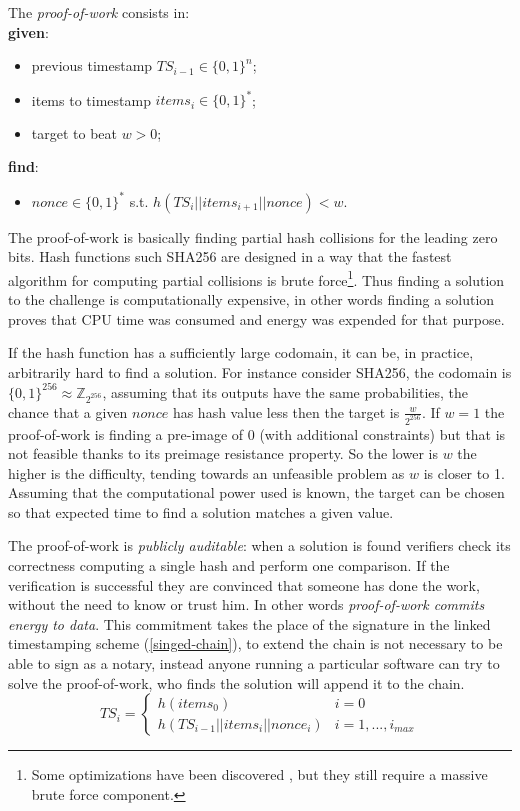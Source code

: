 \begin{mydef}The {\textit{proof-of-work}} consists in:
\label{pow}
\\
\textbf{given}:
\begin{itemize}
	\item previous timestamp $TS_{i-1} \in \{0,1\}^n$;
	\item items to timestamp $items_i \in \{0,1\}^*$;
	\item target to beat $w>0$;
\end{itemize}
\textbf{find}:
\begin{itemize}
	\item $nonce \in \{0,1\}^*$ s.t. $h(TS_i || items_{i+1} || nonce) < w$.
\end{itemize}
\end{mydef}

The proof-of-work is basically finding partial hash collisions for the leading zero bits. Hash functions such SHA256 are designed in a way that the fastest algorithm for computing partial collisions is brute force\footnote{Some optimizations have been discovered \cite{DBLP:journals/corr/Hanke16}, but they still require a massive brute force component.}. Thus finding a solution to the challenge is computationally expensive, in other words finding a solution proves that CPU time was consumed and energy was expended for that purpose.
 
If the hash function has a sufficiently large codomain, it can be, in practice, arbitrarily hard to find a solution. For instance consider SHA256, the codomain is $\{0,1\}^{256} \approx \mathbb{Z}_{2^{256}}$, assuming that its outputs have the same probabilities, the chance that a given $nonce$ has hash value less then the target is $\frac{w}{2^{256}}$.  
If $w=1$ the proof-of-work is finding a pre-image of 0 (with additional constraints) but that is not feasible thanks to its preimage resistance property. 
So the lower is $w$ the higher is the difficulty, tending towards an unfeasible problem as $w$ is closer to 1. 
Assuming that the computational power used is known, the target can be chosen so that expected time to find a solution matches a given value.

The proof-of-work is \textit{publicly auditable}: when a solution is found verifiers check its correctness computing a single hash and perform one comparison. If the verification is successful they are convinced that someone has done the work, without the need to know or trust him. In other words \textit{proof-of-work commits energy to data}.
This commitment takes the place of the signature in the linked timestamping scheme (\ref{singed-chain}), to extend the chain is not necessary to be able to sign as a notary, instead anyone running a particular software can try to solve the proof-of-work, who finds the solution will append it to the chain. 
\begin{equation}
\label{chain-nonce}
TS_i =   
\begin{cases} 
h(items_0) & i=0\\ 
 h(TS_{i-1}||items_i||nonce_i) & i=1, ..., i_{max} 
\end{cases}
\end{equation}

